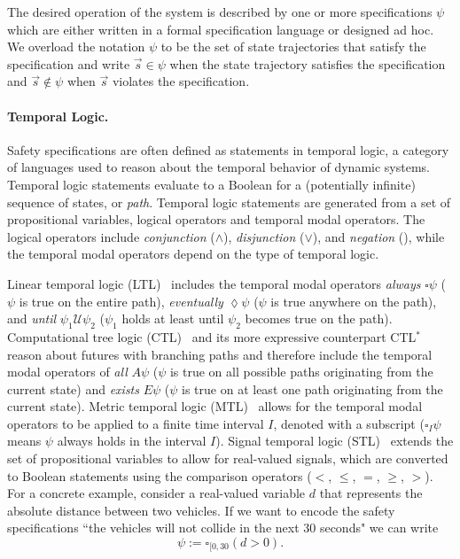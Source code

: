 The desired operation of the system is described by one or more specifications $\psi$ which are either written in a formal specification language or designed ad hoc. We overload the notation $\psi$ to be the set of state trajectories that satisfy the specification and write $\vec{s} \in \psi$ when the state trajectory satisfies the specification and $\vec{s} \not \in \psi$ when $\vec{s}$ violates the specification.

\paragraph{Temporal Logic.} Safety specifications are often defined as statements in temporal logic, a category of languages used to reason about the temporal behavior of dynamic systems. Temporal logic statements evaluate to a Boolean for a (potentially infinite) sequence of states, or \emph{path}. Temporal logic statements are generated from a set of propositional variables, logical operators and temporal modal operators. The logical operators include \emph{conjunction} ($\land$), \emph{disjunction} ($\lor$), and \emph{negation} (\lnot), while the temporal modal operators depend on the type of temporal logic. 

Linear temporal logic (LTL)~\cite{pnueli1977temporal} includes the temporal modal operators \emph{always} $\square \psi$ ($\psi$ is true on the entire path), \emph{eventually} $\lozenge \psi$ ($\psi$ is true anywhere on the path), and \emph{until} $\psi_1 \mathcal{U} \psi_2$ ($\psi_1$ holds at least until $\psi_2$ becomes true on the path). Computational tree logic (CTL)~\cite{clarke1981design} and its more expressive counterpart CTL$^*$~\cite{emerson1986sometimes} reason about futures with branching paths and therefore include the temporal modal operators of \emph{all} $A \psi$ ($\psi$ is true on all possible paths originating from the current state) and \emph{exists} $E \psi$ ($\psi$ is true on at least one path originating from the current state). Metric temporal logic (MTL)~\cite{koymans1990specifying} allows for the temporal modal operators to be applied to a finite time interval $I$, denoted with a subscript ($\square_I \psi$ means $\psi$ always holds in the interval $I$). Signal temporal logic (STL)~\cite{maler2004monitoring} extends the set of propositional variables to allow for real-valued signals, which are converted to Boolean statements using the comparison operators ($<$, $\leq$, $=$, $\geq$, $>$). For a concrete example, consider a real-valued variable $d$ that represents the absolute distance between two vehicles. If we want to encode the safety specifications ``the vehicles will not collide in the next 30 seconds" we can write
\begin{equation}
    \psi := \square_{[0,30} (d > 0) \text{.}
\end{equation}



